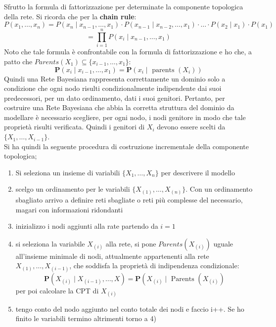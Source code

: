 \documentclass[a4paper,12pt, oneside]{book}
\begin{document}
Sfrutto la formula di fattorizzazione per determinate la
componente topologica della rete. Si ricorda che per la \textbf{chain rule}:
\small{\[P\left(x_{1}, \ldots, x_{n}\right)=P\left(x_{n} \mid x_{n-1}, \ldots,
      x_{1}\right) \cdot P\left(x_{n-1} \mid x_{n-2}, \ldots, x_{1}\right) \cdot
    \ldots \cdot P\left(x_{2} \mid x_{1}\right) \cdot
    P\left(x_{1}\right)\]\[
    =\prod_{i=1}^n P\left(x_{i} \mid x_{n-1}, \ldots,
      x_{1}\right)\]}
Noto che tale formula è confrontabile con la formula di fattorizzazione e ho
che, a patto che $Parents(X_1)\subseteq \{x_{i-1},\ldots,x_1\}$:
\[\mathbf{P}\left(x_{i} \mid x_{i-1}, \ldots,
    x_{1}\right)=\mathbf{P}\left(x_{i} \mid \text { parents
    }\left(X_{i}\right)\right)\] 
Quindi una Rete Bayesiana rappresenta correttamente un dominio solo a
condizione che ogni nodo risulti condizionalmente indipendente dai suoi
predecessori, per un dato ordinamento, dati i suoi genitori. Pertanto, per
costruire una Rete Bayesiana che abbia la corretta struttura del dominio da
modellare è necessario scegliere, per ogni nodo, i nodi genitore in modo che
tale proprietà risulti verificata. Quindi i genitori di $X_i$ devono essere
scelti da $\{X_1,\ldots,X_{i-1}\}$.\\
Si ha quindi la seguente procedura di costruzione incrementale della
componente topologica;
\begin{enumerate}
  \item Si seleziona un insieme di variabili $\{X_1,\ldots, X_n\}$ per
  descrivere il modello
  \item scelgo un ordinamento per le variabili $\{X_{(1)},\ldots,
  X_{(n)}\}$. Con un ordinamento sbagliato arrivo a definire reti sbagliate o
  reti più complesse del necessario, magari con informazioni ridondanti
  \item inizializzo i nodi aggiunti alla rate partendo da $i=1$
  \item si seleziona la variabile $X_{(i)}$ alla rete, si pone
  $Parents(X_{(i)})$ uguale all’insieme minimale di nodi, attualmente
  appartenenti alla rete ${X_{(1)},\ldots, X_{(i-1)}}$, che soddisfa la
  proprietà di indipendenza condizionale:
  \[\mathbf{P}\left(X_{(i)} \mid X_{(i-1)}, \ldots,
      X\right)=\mathbf{P}\left(X_{(i)} \mid\right. \text { Parents
    }\left(X_{(i)}\right)\]
  per poi calcolare la CPT di $X_{(i)}$
  \item tengo conto del nodo aggiunto nel conto totale dei nodi e faccio
  i++. Se ho finito le variabili termino altrimenti torno a 4)
\end{enumerate}
\end{document}
